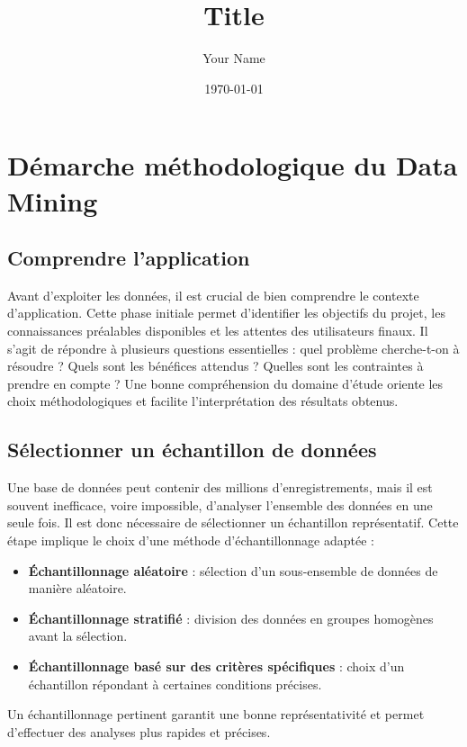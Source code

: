 \documentclass{article}
\title{Title}
\author{Your Name}
\date{\today}
\begin{document}
\maketitle

\section{Démarche méthodologique du Data Mining}
     \subsection{Comprendre l’application}
         Avant d’exploiter les données, il est crucial de bien comprendre le contexte d’application. Cette phase initiale permet d’identifier les objectifs du projet, les connaissances préalables disponibles et les attentes des utilisateurs finaux. Il s’agit de répondre à plusieurs questions essentielles : quel problème cherche-t-on à résoudre ? Quels sont les bénéfices attendus ? Quelles sont les contraintes à prendre en compte ? Une bonne compréhension du domaine d’étude oriente les choix méthodologiques et facilite l’interprétation des résultats obtenus.

     \subsection{Sélectionner un échantillon de données}
         Une base de données peut contenir des millions d’enregistrements, mais il est souvent inefficace, voire impossible, d’analyser l’ensemble des données en une seule fois. Il est donc nécessaire de sélectionner un échantillon représentatif. Cette étape implique le choix d’une méthode d’échantillonnage adaptée :
    
         \begin{itemize}
             \item \textbf{Échantillonnage aléatoire} : sélection d’un sous-ensemble de données de manière aléatoire.
        
             \item \textbf{Échantillonnage stratifié} : division des données en groupes homogènes avant la sélection.
        
             \item \textbf{Échantillonnage basé sur des critères spécifiques} : choix d’un échantillon répondant à certaines conditions précises.
         \end{itemize}
    
        Un échantillonnage pertinent garantit une bonne représentativité et permet d’effectuer des analyses plus rapides et précises.
\end{document}
